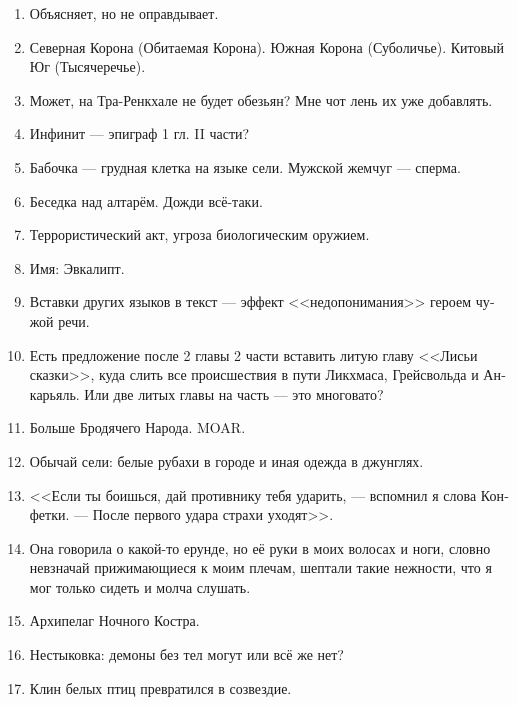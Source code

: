 \documentclass[a4paper,12pt,fleqn]{book}\usepackage{polyglossia}\setdefaultlanguage[babelshorthands=true]{russian}\setotherlanguage{english}\defaultfontfeatures{Ligatures=TeX,Mapping=tex-text}\usepackage{xcolor}\newcommand{\ml}[3]{#2}
\begin{document}
{\begin{enumerate}
\item Объясняет, но не оправдывает.

\item Северная Корона (Обитаемая Корона).
Южная Корона (Суболичье).
Китовый Юг (Тысячеречье).

\item Может, на Тра-Ренкхале не будет обезьян?
Мне чот лень их уже добавлять.

\item Инфинит --- эпиграф 1 гл. II части?

\item Бабочка --- грудная клетка на языке сели.
Мужской жемчуг --- сперма.

\item Беседка над алтарём.
Дожди всё-таки.

\item Террористический акт, угроза биологическим оружием.

\item Имя: Эвкалипт.

\item Вставки других языков в текст --- эффект <<недопонимания>> героем чужой речи.

\item Есть предложение после 2 главы 2 части вставить литую главу <<Лисьи сказки>>, куда слить все происшествия в пути Ликхмаса, Грейсвольда и Анкарьяль.
Или две литых главы на часть --- это многовато?

\item Больше Бродячего Народа.
MOAR.

\item Обычай сели: белые рубахи в городе и иная одежда в джунглях.

\item <<Если ты боишься, дай противнику тебя ударить, --- вспомнил я слова Конфетки.
--- После первого удара страхи уходят>>.

\item Она говорила о какой-то ерунде, но её руки в моих волосах и ноги, словно невзначай прижимающиеся к моим плечам, шептали такие нежности, что я мог только сидеть и молча слушать.

\item Архипелаг Ночного Костра.

\item Нестыковка: демоны без тел могут или всё же нет?

\item Клин белых птиц превратился в созвездие.


\end{enumerate}}
\end{document}
